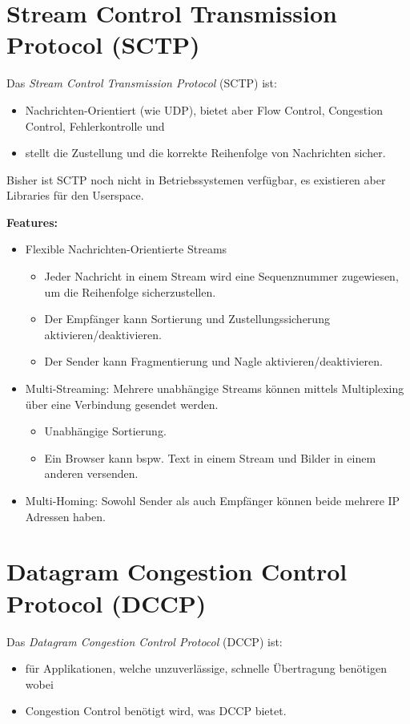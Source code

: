     \section{Stream Control Transmission Protocol (SCTP)}
        Das \textit{Stream Control Transmission Protocol} (SCTP) ist:
        \begin{itemize}
        	\item Nachrichten-Orientiert (wie UDP), bietet aber Flow Control, Congestion Control, Fehlerkontrolle und
        	\item stellt die Zustellung und die korrekte Reihenfolge von Nachrichten sicher.
        \end{itemize}
        
        Bisher ist SCTP noch nicht in Betriebssystemen verfügbar, es existieren aber Libraries für den Userspace.
        
        \textbf{Features:}
        \begin{itemize}
        	\item Flexible Nachrichten-Orientierte Streams
            	\begin{itemize}
            		\item Jeder Nachricht in einem Stream wird eine Sequenznummer zugewiesen, um die Reihenfolge sicherzustellen.
            		\item Der Empfänger kann Sortierung und Zustellungssicherung aktivieren/deaktivieren.
            		\item Der Sender kann Fragmentierung und Nagle aktivieren/deaktivieren.
            	\end{itemize}
            \item Multi-Streaming: Mehrere unabhängige Streams können mittels Multiplexing über eine Verbindung gesendet werden.
	            \begin{itemize}
	            	\item Unabhängige Sortierung.
	            	\item Ein Browser kann bspw. Text in einem Stream und Bilder in einem anderen versenden.
	            \end{itemize}
		    \item Multi-Homing: Sowohl Sender als auch Empfänger können beide mehrere IP Adressen haben.
        \end{itemize}

    \section{Datagram Congestion Control Protocol (DCCP)}
        Das \textit{Datagram Congestion Control Protocol} (DCCP) ist:
        \begin{itemize}
        	\item für Applikationen, welche unzuverlässige, schnelle Übertragung benötigen wobei
        	\item Congestion Control benötigt wird, was DCCP bietet.
        \end{itemize}
        
